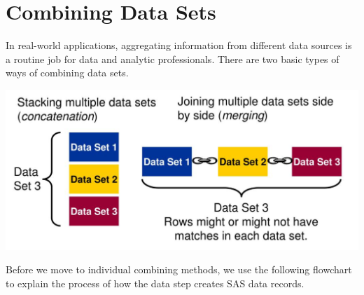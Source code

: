 \documentclass[
]{book}
\begin{document}
\hypertarget{combining-data-sets}{%
\chapter{Combining Data Sets}\label{combining-data-sets}}

In real-world applications, aggregating information from different data sources is a routine job for data and analytic professionals. There are two basic types of ways of combining data
sets.

\begin{center}\includegraphics[width=0.8\linewidth]{img08/w08-combingDataMethods} \end{center}

Before we move to individual combining methods, we use the following flowchart to explain the process of how the data step creates SAS data records.
\end{document}
